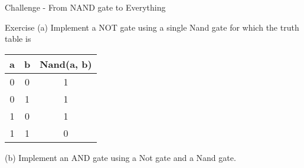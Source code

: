\documentclass{beamer}
\begin{document}
\begin{frame}[t]{Challenge - From NAND gate to Everything}
\begin{block}{Exercise}
    (a) Implement a NOT gate using a single Nand gate for which the truth table is
    \begin{table}[]
        \centering
        \begin{tabular}{c|c|c}
             a & b & Nand(a, b) \\
             \hline
             0 & 0 & 1 \\
             0 & 1 & 1 \\
             1 & 0 & 1 \\
             1 & 1 & 0
        \end{tabular}
    \end{table}
    (b) Implement an AND gate using a Not gate and a Nand gate. 
\end{block}
    
\end{frame}
\end{document}
